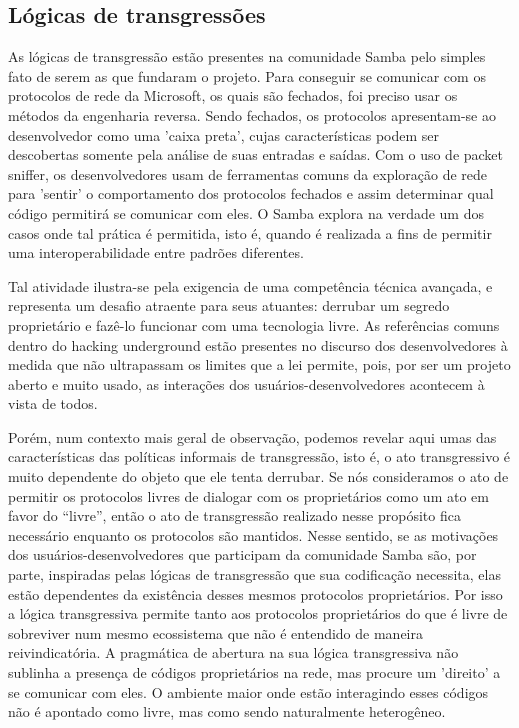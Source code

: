 \subsection{Lógicas de transgressões} \label{3.3.1}

As lógicas de transgressão estão presentes na comunidade Samba pelo simples fato de serem as que fundaram o projeto. Para conseguir se comunicar com os protocolos de rede da Microsoft, os quais são fechados, foi preciso usar os métodos da engenharia reversa. Sendo fechados, os protocolos apresentam-se ao desenvolvedor como uma 'caixa preta', cujas características podem ser descobertas somente pela análise de suas entradas e saídas. Com o uso de packet sniffer, os desenvolvedores usam de ferramentas comuns da exploração de rede para 'sentir' o comportamento dos protocolos fechados e assim determinar qual código permitirá se comunicar com eles. O Samba explora na verdade um dos casos onde tal prática é permitida, isto é, quando é realizada a fins de permitir uma interoperabilidade entre padrões diferentes.

Tal atividade ilustra-se pela exigencia de uma competência técnica avançada, e representa um desafio atraente para seus atuantes: derrubar um segredo proprietário e fazê-lo funcionar com uma tecnologia livre. As referências comuns dentro do hacking underground estão presentes no discurso dos desenvolvedores à medida que não ultrapassam os limites que a lei permite, pois, por ser um projeto aberto e muito usado, as interações dos usuários-desenvolvedores acontecem à vista de todos.

Porém, num contexto mais geral de observação, podemos revelar aqui umas das características das políticas informais de transgressão, isto é, o ato transgressivo é muito dependente do objeto que ele tenta derrubar. Se nós consideramos o ato de permitir os protocolos livres de dialogar com os proprietários como um ato em favor do “livre”, então o ato de transgressão realizado nesse propósito fica necessário enquanto os protocolos são mantidos. Nesse sentido, se as motivações dos usuários-desenvolvedores que participam da comunidade Samba são, por parte, inspiradas pelas lógicas de transgressão que sua codificação necessita, elas estão dependentes da existência desses mesmos protocolos proprietários. Por isso a lógica transgressiva permite tanto aos protocolos proprietários do que é livre de sobreviver num mesmo ecossistema que não é entendido de maneira reivindicatória. A pragmática de abertura na sua lógica transgressiva não sublinha a presença de códigos proprietários na rede, mas procure um 'direito' a se comunicar com eles. O ambiente maior onde estão interagindo esses códigos não é apontado como livre, mas como sendo naturalmente heterogêneo.


